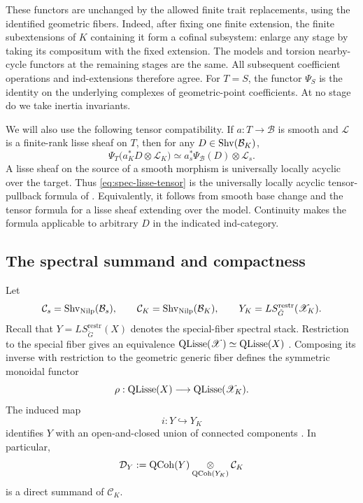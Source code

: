 These functors are unchanged by the allowed finite trait replacements,
using the identified geometric fibers.  Indeed, after fixing one finite
extension, the finite subextensions of $K$ containing it form a cofinal
subsystem: enlarge any stage by taking its compositum with the fixed
extension.  The models and torsion nearby-cycle functors at the remaining
stages are the same.  All subsequent coefficient operations and
ind-extensions therefore agree.  For $T=S$, the functor $\Psi_S$ is the
identity on the underlying complexes of geometric-point coefficients.
At no stage do we take inertia invariants.

We will also use the following tensor compatibility.  If
$a:T\to\mathcal B$ is smooth and $\mathcal L$ is a finite-rank lisse sheaf
on $T$, then for any $D\in\operatorname{Shv}(\mathcal B_K)$,
\begin{equation}
 \Psi_T\bigl(a_K^*D\otimes\mathcal L_K\bigr)
 \simeq
 a_s^*\Psi_{\mathcal B}(D)\otimes\mathcal L_s.
 \label{eq:spec-lisse-tensor}
\end{equation}
A lisse sheaf on the source of a smooth morphism is universally locally
acyclic over the target.  Thus \eqref{eq:spec-lisse-tensor} is the
universally locally acyclic tensor-pullback formula of
\cite[Lemma~4.1.9]{GR}.  Equivalently, it follows from smooth base change
and the tensor formula for a lisse sheaf extending over the model.
Continuity makes the formula applicable to arbitrary $D$ in the indicated
ind-category.

\subsection{The spectral summand and compactness}

Let
\[
 \mathcal C_s=\operatorname{Shv}_{\operatorname{Nilp}}(\mathcal B_s),\qquad
 \mathcal C_K=\operatorname{Shv}_{\operatorname{Nilp}}(\mathcal B_K),\qquad
 Y_K=LS^{\mathrm{restr}}_{\check G}(\mathscr X_K).
\]
Recall that $Y=LS^{\mathrm{restr}}_{\check G}(X)$ denotes the special-fiber
spectral stack. Restriction to the special fiber gives an equivalence
$\operatorname{QLisse}(\mathscr X)\simeq\operatorname{QLisse}(X)$
\cite[\S3.1.3]{GR}. Composing its inverse with restriction to the
geometric generic fiber defines the symmetric monoidal functor
\[
 \rho:\operatorname{QLisse}(X)\longrightarrow\operatorname{QLisse}(\mathscr X_K).
\]
The induced map
\[
 i:Y\hookrightarrow Y_K
\]
identifies $Y$ with an open-and-closed union of connected components
\cite[\S3.1.3]{GR}.  In particular,
\begin{equation}
 \mathcal D_Y
 :=\operatorname{QCoh}(Y)\underset{\operatorname{QCoh}(Y_K)}\otimes\mathcal C_K
 \label{eq:spec-DY}
\end{equation}
is a direct summand of $\mathcal C_K$.

